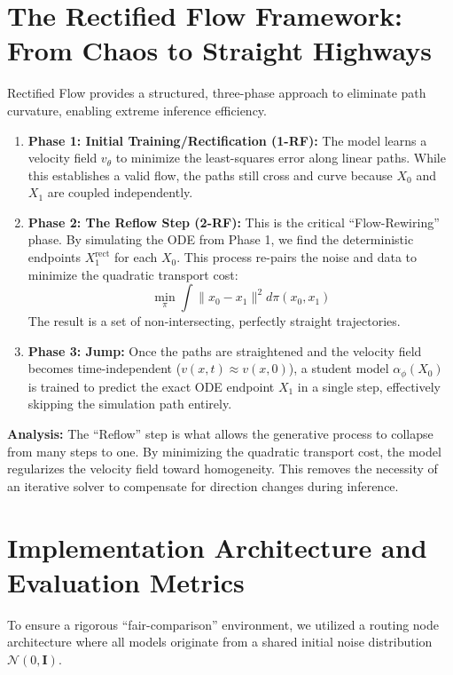 \documentclass[11pt,a4paper]{article}
\begin{document}
\section{The Rectified Flow Framework: From Chaos to Straight Highways}
Rectified Flow provides a structured, three-phase approach to eliminate path curvature, enabling extreme inference efficiency.

\begin{enumerate}
    \item \textbf{Phase 1: Initial Training/Rectification (1-RF):} The model learns a velocity field $v_\theta$ to minimize the least-squares error along linear paths. While this establishes a valid flow, the paths still cross and curve because $X_0$ and $X_1$ are coupled independently.
    \item \textbf{Phase 2: The Reflow Step (2-RF):} This is the critical ``Flow-Rewiring'' phase. By simulating the ODE from Phase 1, we find the deterministic endpoints $X^{\text{rect}}_1$ for each $X_0$. This process re-pairs the noise and data to minimize the quadratic transport cost:
    \begin{equation}
    \min_\pi \int \|x_0 - x_1\|^2 d\pi(x_0, x_1)
    \end{equation}
    The result is a set of non-intersecting, perfectly straight trajectories.
    \item \textbf{Phase 3: Jump:} Once the paths are straightened and the velocity field becomes time-independent ($v(x, t) \approx v(x, 0)$), a student model $\alpha_\phi(X_0)$ is trained to predict the exact ODE endpoint $X_1$ in a single step, effectively skipping the simulation path entirely.
\end{enumerate}

\noindent\textbf{Analysis:} The ``Reflow'' step is what allows the generative process to collapse from many steps to one. By minimizing the quadratic transport cost, the model regularizes the velocity field toward homogeneity. This removes the necessity of an iterative solver to compensate for direction changes during inference.

\section{Implementation Architecture and Evaluation Metrics}
To ensure a rigorous ``fair-comparison'' environment, we utilized a routing node architecture where all models originate from a shared initial noise distribution $\mathcal{N}(0, \mathbf{I})$.
\end{document}
